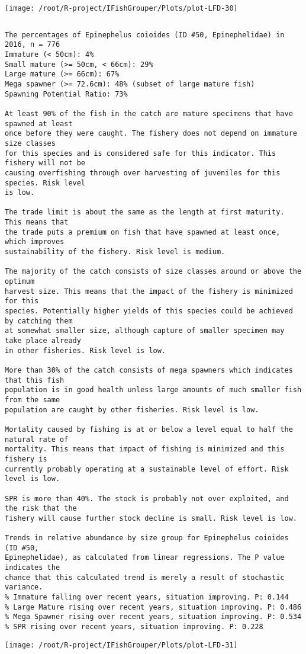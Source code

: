 \documentclass{report}\usepackage[]{graphicx}\usepackage[]{color}
\makeatletter
\def\maxwidth{ %
  \ifdim\Gin@nat@width>\linewidth
    \linewidth
  \else
    \Gin@nat@width
  \fi
}
\newenvironment{kframe}{%
 \def\at@end@of@kframe{}%
 \ifinner\ifhmode%
  \def\at@end@of@kframe{\end{minipage}}%
  \begin{minipage}{\columnwidth}%
 \fi\fi%
 \def\FrameCommand##1{\hskip\@totalleftmargin \hskip-\fboxsep
 \colorbox{shadecolor}{##1}\hskip-\fboxsep
     \hskip-\linewidth \hskip-\@totalleftmargin \hskip\columnwidth}%
 \MakeFramed {\advance\hsize-\width
   \@totalleftmargin\z@ \linewidth\hsize
   \@setminipage}}%
 {\par\unskip\endMakeFramed%
 \at@end@of@kframe}
\newenvironment{knitrout}{}{} %
\makeatother
\begin{document}
\begin{knitrout}
\texttt{[image: /root/R-project/IFishGrouper/Plots/plot-LFD-30]} 
\begin{kframe}\begin{verbatim}
\end{verbatim}
\end{kframe}
\clearpage
\newpage
\begin{kframe}\begin{verbatim}The percentages of Epinephelus coioides (ID #50, Epinephelidae) in 2016, n = 776
Immature (< 50cm): 4%
Small mature (>= 50cm, < 66cm): 29%
Large mature (>= 66cm): 67%
Mega spawner (>= 72.6cm): 48% (subset of large mature fish)
Spawning Potential Ratio: 73%
 
At least 90% of the fish in the catch are mature specimens that have spawned at least
once before they were caught. The fishery does not depend on immature size classes
for this species and is considered safe for this indicator. This fishery will not be
causing overfishing through over harvesting of juveniles for this species. Risk level
is low.

The trade limit is about the same as the length at first maturity.  This means that
the trade puts a premium on fish that have spawned at least once, which improves
sustainability of the fishery. Risk level is medium.

The majority of the catch consists of size classes around or above the optimum
harvest size. This means that the impact of the fishery is minimized for this
species. Potentially higher yields of this species could be achieved by catching them
at somewhat smaller size, although capture of smaller specimen may take place already
in other fisheries. Risk level is low.

More than 30% of the catch consists of mega spawners which indicates that this fish
population is in good health unless large amounts of much smaller fish from the same
population are caught by other fisheries. Risk level is low.
 
Mortality caused by fishing is at or below a level equal to half the natural rate of
mortality. This means that impact of fishing is minimized and this fishery is
currently probably operating at a sustainable level of effort. Risk level is low.
 
SPR is more than 40%. The stock is probably not over exploited, and the risk that the
fishery will cause further stock decline is small. Risk level is low.
 
Trends in relative abundance by size group for Epinephelus coioides (ID #50,
Epinephelidae), as calculated from linear regressions. The P value indicates the
chance that this calculated trend is merely a result of stochastic variance.
% Immature falling over recent years, situation improving. P: 0.144
% Large Mature rising over recent years, situation improving. P: 0.486
% Mega Spawner rising over recent years, situation improving. P: 0.534
% SPR rising over recent years, situation improving. P: 0.228
\end{verbatim}
\end{kframe}
\texttt{[image: /root/R-project/IFishGrouper/Plots/plot-LFD-31]} 


\end{knitrout}
\end{document}
